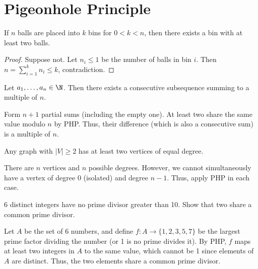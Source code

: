 \documentclass[a4paper]{article}
\begin{document}
\tableofcontents
\pagebreak

\section{Pigeonhole Principle}
\begin{theorem}
If $n$ balls are placed into $k$ bins for $0<k<n$, then there exists a bin with at least two balls.

\begin{hl}
\begin{proof}
Suppose not. Let $n_i\leq1$ be the number of balls in bin $i$. Then $n=\sum_{i=1}^kn_i\leq k$, contradiction.
\end{proof}
\end{hl}
\end{theorem}

\begin{example}\label{consec_subseq}
Let $a_1,\dots,a_n\in\N$. Then there exists a consecutive subsequence summing to a multiple of $n$.

\begin{hl}
Form $n+1$ partial sums (including the empty one). At least two share the same value modulo $n$ by PHP. Thus, their difference (which is also a consecutive sum) is a multiple of $n$.
\end{hl}
\end{example}

\begin{example}
Any graph with $|V|\geq2$ has at least two vertices of equal degree.

\begin{hl}
There are $n$ vertices and $n$ possible degrees. However, we cannot simultaneously have a vertex of degree 0 (isolated) and degree $n-1$. Thus, apply PHP in each case.
\end{hl}
\end{example}

\begin{example}
6 distinct integers have no prime divisor greater than 10. Show that two share a common prime divisor.

\begin{hl}
Let $A$ be the set of 6 numbers, and define $f:A\rightarrow\{1,2,3,5,7\}$ be the largest prime factor dividing the number (or 1 is no prime divides it). By PHP, $f$ maps at least two integers in $A$ to the same value, which cannot be 1 since elements of $A$ are distinct. Thus, the two elements share a common prime divisor.
\end{hl}
\end{example}
\end{document}
